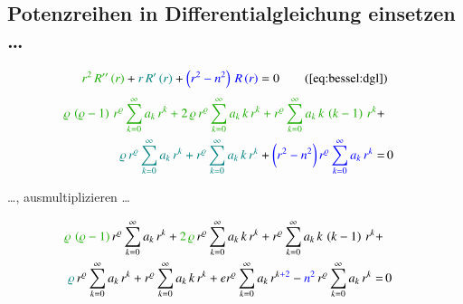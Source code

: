 \subsection[Potenzreihen in Differentialgleichung \refeq{eq:bessel:dgl} einsetzen]{Potenzreihen in Differentialgleichung  einsetzen \dots}
%

\begin{align*}
	\textcolor{mygreen}{r^2 \, R'' \left( r \right)}
	+
	\textcolor{teal}{r \, R' \left( r \right)}
	+
	\textcolor{blue}{\left( r^2 - n^2 \right) \, R \left( r \right)}
	=
	0
	\tag{\ref{eq:bessel:dgl}}
\end{align*}
%
\begin{align*}	
	\textcolor{mygreen}{
		\varrho \, \left( \varrho - 1 \right) \, r^{\varrho}
		\sum_{k=0}^{\infty} a_k \, r^k
		+
		2 \, \varrho \, r^{\varrho}
		\sum_{k=0}^{\infty} a_k \, k \, r^k
		+
		r^{\varrho}
		\sum_{k=0}^{\infty} a_k \, k \, \left( k - 1 \right) \, r^k
	}
	+ \\
	\textcolor{teal}{
		\varrho \, r^{\varrho}
		\sum_{k=0}^{\infty} a_k \, r^k
		+
		r^{\varrho}
		\sum_{k=0}^{\infty} a_k \, k \, r^k
	}
	+ 
	\textcolor{blue}{
		\biggl(
		r^2 - n^2
		\biggr) \,
		r^{\varrho}
		\sum_{k=0}^{\infty} a_k \, r^k
	}
	= & \, 0
\end{align*}
\begin{normalsize}
	\dots , ausmultiplizieren \dots
\end{normalsize}
\begin{align*}
	\textcolor{mygreen}{	\varrho \, \left( \varrho - 1 \right)} 
	\, r^{\varrho}
	\sum_{k=0}^{\infty} a_k \, r^k
	+
	\textcolor{mygreen}{2 \, \varrho}
	\, r^{\varrho}
	\sum_{k=0}^{\infty} a_k \, k \, r^k
	+
	r^{\varrho}
	\sum_{k=0}^{\infty} a_k \, k \, \left( k - 1 \right) \, r^k
	+ \\
	\textcolor{teal}{\varrho}
	\, r^{\varrho}
	\sum_{k=0}^{\infty} a_k \, r^k
	+
	r^{\varrho}
	\sum_{k=0}^{\infty} a_k \, k \, r^k
	+ e
	r^{\varrho}
		\sum_{k=0}^{\infty} a_k \, r^{k \textcolor{blue}{+ 2}}
	-
	\textcolor{blue}{n^2}
	\, r^{\varrho}
	\sum_{k=0}^{\infty} a_k \, r^k
	= & \, 0
\end{align*}
\\
